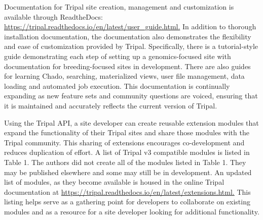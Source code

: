 Documentation for Tripal site creation, management and customization is available through ReadtheDocs: \url{https://tripal.readthedocs.io/en/latest/user_guide.html.} In addition to thorough installation documentation, the documentation also demonstrates the flexibility and ease of customization provided by Tripal. Specifically, there is a tutorial-style guide demonstrating each step of setting up a genomics-focused site with documentation for breeding-focused sites in development. There are also guides for learning Chado, searching, materialized views, user file management, data loading and automated job execution. This documentation is continually expanding as new feature sets and community questions are voiced, ensuring that it is maintained and accurately reflects the current version of Tripal.

Using the Tripal API, a site developer can create reusable extension modules that expand the functionality of their Tripal sites and share those modules with the Tripal community. This sharing of extensions encourages co-development and reduces duplication of effort. A list of Tripal v3 compatible modules is listed in Table 1. The authors did not create all of the modules listed in Table 1. They may be published elsewhere and some may still be in development. An updated list of modules, as they become available is housed in the online Tripal documentation at \url{https://tripal.readthedocs.io/en/latest/extensions.html.} This listing helps serve as a gathering point for developers to collaborate on existing modules and as a resource for a site developer looking for additional functionality.


